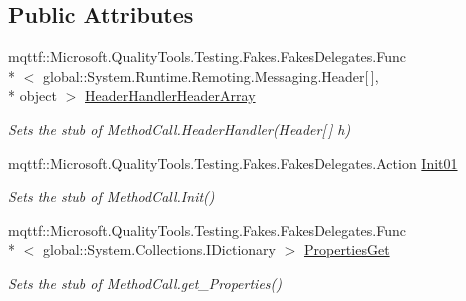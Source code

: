 \subsection*{Public Attributes}
\begin{DoxyCompactItemize}
\item 
mqttf\-::\-Microsoft.\-Quality\-Tools.\-Testing.\-Fakes.\-Fakes\-Delegates.\-Func\\*
$<$ global\-::\-System.\-Runtime.\-Remoting.\-Messaging.\-Header\mbox{[}$\,$\mbox{]}, \\*
object $>$ \hyperlink{class_system_1_1_runtime_1_1_remoting_1_1_messaging_1_1_fakes_1_1_stub_method_call_a143d68d5d711d2d4da524be5cd019ff7}{Header\-Handler\-Header\-Array}
\begin{DoxyCompactList}\small\item\em Sets the stub of Method\-Call.\-Header\-Handler(\-Header\mbox{[}$\,$\mbox{]} h)\end{DoxyCompactList}\item 
mqttf\-::\-Microsoft.\-Quality\-Tools.\-Testing.\-Fakes.\-Fakes\-Delegates.\-Action \hyperlink{class_system_1_1_runtime_1_1_remoting_1_1_messaging_1_1_fakes_1_1_stub_method_call_a445d235c5b3d5c49dc54db5287cbee56}{Init01}
\begin{DoxyCompactList}\small\item\em Sets the stub of Method\-Call.\-Init()\end{DoxyCompactList}\item 
mqttf\-::\-Microsoft.\-Quality\-Tools.\-Testing.\-Fakes.\-Fakes\-Delegates.\-Func\\*
$<$ global\-::\-System.\-Collections.\-I\-Dictionary $>$ \hyperlink{class_system_1_1_runtime_1_1_remoting_1_1_messaging_1_1_fakes_1_1_stub_method_call_a625673605f72dd18293713264a34cedf}{Properties\-Get}
\begin{DoxyCompactList}\small\item\em Sets the stub of Method\-Call.\-get\-\_\-\-Properties()\end{DoxyCompactList}\end{DoxyCompactItemize}
